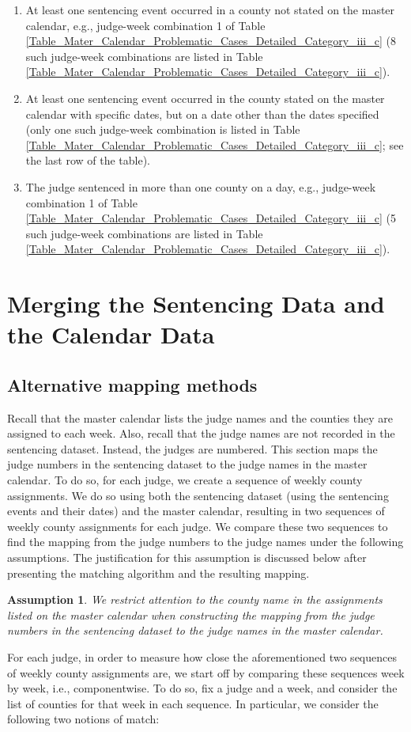 \documentclass[11pt]{article}
\theoremstyle{ModifiedStyle}
\newtheorem{assumption}{Assumption}
\begin{document}
      \begin{enumerate}
        \item At least one sentencing event occurred in a county not stated on the master calendar, e.g., judge-week combination 1 of Table \ref{Table_Mater_Calendar_Problematic_Cases_Detailed_Category_iii_c} (8 such judge-week combinations are listed in Table \ref{Table_Mater_Calendar_Problematic_Cases_Detailed_Category_iii_c}).
        \item At least one sentencing event occurred in the county stated on the master calendar with specific dates, but on a date other than the dates specified (only one such judge-week combination is listed in Table \ref{Table_Mater_Calendar_Problematic_Cases_Detailed_Category_iii_c}; see the last row of the table).
        \item The judge sentenced in more than one county on a day, e.g., judge-week combination 1 of Table \ref{Table_Mater_Calendar_Problematic_Cases_Detailed_Category_iii_c} (5 such judge-week combinations are listed in Table \ref{Table_Mater_Calendar_Problematic_Cases_Detailed_Category_iii_c}).
      \end{enumerate}

\section{Merging the Sentencing Data and the Calendar Data}
  \label{app-map}
  \subsection{Alternative mapping methods}
    Recall that the master calendar lists the judge names and the counties they are assigned to each week. Also, recall that the judge names are not recorded in the sentencing dataset. Instead, the judges are numbered. This section maps the judge numbers in the sentencing dataset to the judge names in the master calendar. To do so, for each judge, we create a sequence of weekly county assignments. We do so using both the sentencing dataset (using the sentencing events and their dates) and the master calendar, resulting in two sequences of weekly county assignments for each judge. We compare these two sequences to find the mapping from the judge numbers to the judge names under the following assumptions. The justification for this assumption is discussed below after presenting the matching algorithm and the resulting mapping.
  	\begin{assumption}
  		We restrict attention to the county name in the assignments listed on the master calendar when constructing the mapping from the judge numbers in the sentencing dataset to the judge names in the master calendar.
  		\label{Assumption_Mapping_Only_County_Assignment_Matter}
  	\end{assumption}
  	For each judge, in order to measure how close the aforementioned two sequences of weekly county assignments are, we start off by comparing these sequences week by week, i.e., componentwise. To do so, fix a judge and a week, and consider the list of counties for that week in each sequence. In particular, we consider the following two notions of match:
  	\vspace{-3mm}
\end{document}
